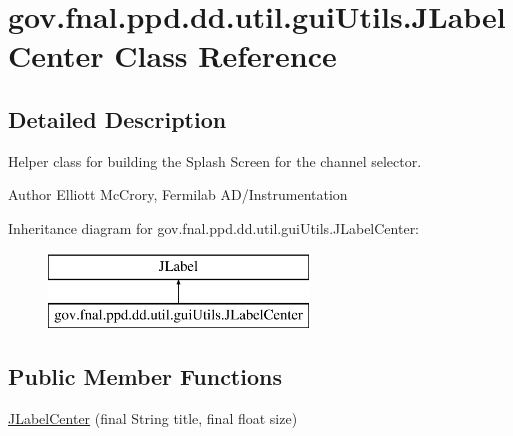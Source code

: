 \hypertarget{classgov_1_1fnal_1_1ppd_1_1dd_1_1util_1_1guiUtils_1_1JLabelCenter}{\section{gov.\-fnal.\-ppd.\-dd.\-util.\-gui\-Utils.\-J\-Label\-Center Class Reference}
\label{classgov_1_1fnal_1_1ppd_1_1dd_1_1util_1_1guiUtils_1_1JLabelCenter}
}


\subsection{Detailed Description}
Helper class for building the Splash Screen for the channel selector.

\begin{DoxyAuthor}{Author}
Elliott Mc\-Crory, Fermilab A\-D/\-Instrumentation 
\end{DoxyAuthor}
Inheritance diagram for gov.\-fnal.\-ppd.\-dd.\-util.\-gui\-Utils.\-J\-Label\-Center\-:\begin{figure}[H]
\begin{center}
\leavevmode
\includegraphics[height=2.000000cm]{classgov_1_1fnal_1_1ppd_1_1dd_1_1util_1_1guiUtils_1_1JLabelCenter}
\end{center}
\end{figure}
\subsection*{Public Member Functions}
\begin{DoxyCompactItemize}
\item 
\hyperlink{classgov_1_1fnal_1_1ppd_1_1dd_1_1util_1_1guiUtils_1_1JLabelCenter_a2af9e08fe6f52968846dd960a16d1026}{J\-Label\-Center} (final String title, final float size)
\end{DoxyCompactItemize}


